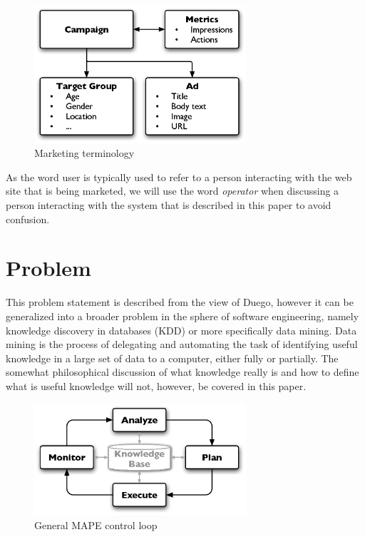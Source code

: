 \documentclass[a4paper]{article}
\begin{document}
\begin{figure}[htb]
\centering
\includegraphics[width=0.7\textwidth]{campaign-terminology.eps}
\caption{Marketing terminology}
\label{fig:MarketingTerminology}
\end{figure}

As the word user is typically used to refer to a person interacting with the web site that is being marketed, we will use the word
\emph{operator} when discussing a person interacting with the system that is described in this paper to avoid confusion.

\section{Problem}
This problem statement is described from the view of Duego, however it can be generalized into a broader problem in the sphere of
software engineering, namely knowledge discovery in databases (KDD) or more specifically data mining. Data mining is the process
of delegating and automating the task of identifying useful knowledge in a large set of data to a computer, either fully or
partially. The somewhat philosophical discussion of what knowledge really is and how to define what is useful knowledge will not,
however, be covered in this paper.

\begin{figure}[htb]
\centering
\includegraphics[width=0.7\textwidth]{mape.eps}
\caption{General MAPE control loop}
\label{fig:MAPE}
\end{figure}
\end{document}

